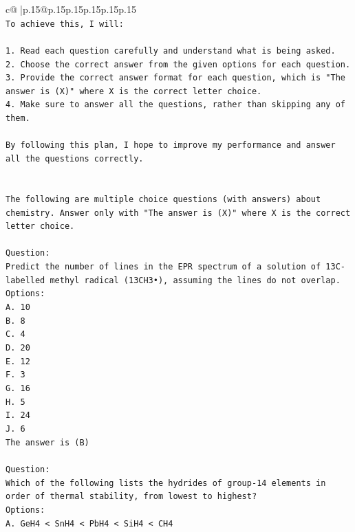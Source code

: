 \documentclass{article}
\begin{document}
{\begin{supertabular}{c@{$\;$}|p{.15\linewidth}@{}p{.15\linewidth}p{.15\linewidth}p{.15\linewidth}p{.15\linewidth}p{.15\linewidth}}
{{{\\ 
\texttt{To achieve this, I will:} \\
\\ 
\texttt{1. Read each question carefully and understand what is being asked.} \\
\texttt{2. Choose the correct answer from the given options for each question.} \\
\texttt{3. Provide the correct answer format for each question, which is "The answer is (X)" where X is the correct letter choice.} \\
\texttt{4. Make sure to answer all the questions, rather than skipping any of them.} \\
\\ 
\texttt{By following this plan, I hope to improve my performance and answer all the questions correctly.} \\
\\ 
\\ 
\texttt{The following are multiple choice questions (with answers) about chemistry. Answer only with "The answer is (X)" where X is the correct letter choice.} \\
\\ 
\texttt{Question:} \\
\texttt{Predict the number of lines in the EPR spectrum of a solution of 13C{-}labelled methyl radical (13CH3•), assuming the lines do not overlap.} \\
\texttt{Options:} \\
\texttt{A. 10} \\
\texttt{B. 8} \\
\texttt{C. 4} \\
\texttt{D. 20} \\
\texttt{E. 12} \\
\texttt{F. 3} \\
\texttt{G. 16} \\
\texttt{H. 5} \\
\texttt{I. 24} \\
\texttt{J. 6} \\
\texttt{The answer is (B)} \\
\\ 
\texttt{Question:} \\
\texttt{Which of the following lists the hydrides of group{-}14 elements in order of thermal stability, from lowest to highest?} \\
\texttt{Options:} \\
\texttt{A. GeH4 < SnH4 < PbH4 < SiH4 < CH4} \\
}}}
\end{supertabular}}
\end{document}
